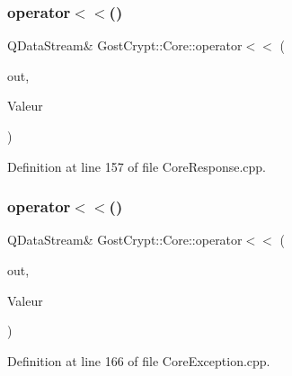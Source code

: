 \mbox{\label{namespace_gost_crypt_1_1_core_ae57484e6c6e6ca8d7b22ed5167e65fb7}} 
\subsubsection{\texorpdfstring{operator$<$$<$()}{operator<<()}\hspace{0.1cm}{\footnotesize\ttfamily [26/56]}}
{\footnotesize\ttfamily Q\+Data\+Stream\& Gost\+Crypt\+::\+Core\+::operator$<$$<$ (\begin{DoxyParamCaption}\item[{Q\+Data\+Stream \&}]{out,  }\item[{const \hyperlink{struct_gost_crypt_1_1_core_1_1_get_encryption_algorithms_response}{Get\+Encryption\+Algorithms\+Response} \&}]{Valeur }\end{DoxyParamCaption})}



Definition at line 157 of file Core\+Response.\+cpp.

\mbox{\label{namespace_gost_crypt_1_1_core_a7b7695f59c153c5a9d7bd79973b4e2ec}} 
\subsubsection{\texorpdfstring{operator$<$$<$()}{operator<<()}\hspace{0.1cm}{\footnotesize\ttfamily [27/56]}}
{\footnotesize\ttfamily Q\+Data\+Stream\& Gost\+Crypt\+::\+Core\+::operator$<$$<$ (\begin{DoxyParamCaption}\item[{Q\+Data\+Stream \&}]{out,  }\item[{const \hyperlink{class_gost_crypt_1_1_core_1_1_failed_attach_loop_device}{Gost\+Crypt\+::\+Core\+::\+Failed\+Attach\+Loop\+Device} \&}]{Valeur }\end{DoxyParamCaption})}



Definition at line 166 of file Core\+Exception.\+cpp.

\mbox{\label{namespace_gost_crypt_1_1_core_afa803936f88459cb0037133936fae1db}} 
